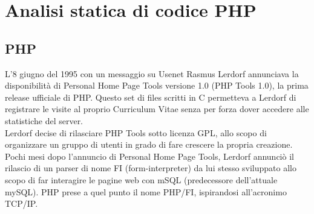 \chapter{Analisi statica di codice PHP}

\begin{epigraphs}
\end{epigraphs}

\section{PHP}
L’8 giugno del 1995 con un messaggio su Usenet Rasmus Lerdorf annunciava la disponibilità di Personal Home Page Tools versione 1.0 (PHP Tools 1.0), la prima release ufficiale di PHP. Questo set di files scritti in C permetteva a Lerdorf di registrare le visite al proprio Curriculum Vitae senza per forza dover accedere alle statistiche del server.\\
Lerdorf decise di rilasciare PHP Tools sotto licenza GPL, allo scopo di organizzare un gruppo di utenti in grado di fare crescere la propria creazione. Pochi mesi dopo l’annuncio di Personal Home Page Tools, Lerdorf annunciò il rilascio di un parser di nome FI (form-interpreter) da lui stesso sviluppato allo scopo di far interagire le pagine web con mSQL (predecessore dell’attuale mySQL). PHP prese a quel punto il nome PHP/FI, ispirandosi all'acronimo TCP/IP.

